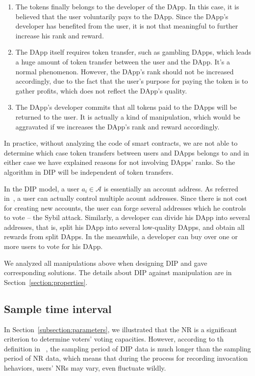   \begin{enumerate}
  	 \item The tokens finally belongs to the developer of the DApp. In this case, it is believed that the user voluntarily pays to the DApp. Since the DApp's developer has benefited from the user, it is not that meaningful to further increase his rank and reward. 
  	\item The DApp itself requires token transfer, such as gambling DApps, which leads  a huge amount of token transfer between the user and the DApp. It's a normal phenomenon. However, the DApp's rank should not be increased accordingly, due to the fact that the user's purpose for paying the token is to gather profits, which does not reflect the DApp's quality.  
   \item The DApp's developer commits that all tokens paid to the DApps will be returned to the user. It is actually a kind of manipulation, which would be aggravated if we increases the DApp's rank and reward accordingly.  
  \end{enumerate}
  In practice, without analyzing the code of smart contracts, we are not able to determine which case token transfers between users and DApps belongs to and in either case we have explained reasons for not involving DApps' ranks. So the algorithm in DIP will be independent of token transfers. 
  
  In the DIP model, a user $a_i \in \mathcal{A}$ is essentially an account address. As referred in~\cite{Nebulasyellowpaper}, a user can actually control multiple acount addresses. Since there is not cost for creating new accounts, the user can forge several addresses which he controls to vote -- the Sybil attack. Similarly, a developer can divide his DApp into several addresses, that is, split his DApp into several low-quality DApps, and obtain all rewards from split DApps. In the meanwhile, a developer can buy over one or more users to vote for his DApp. 
  
  We analyzed all manipulations above when designing DIP and gave corresponding solutions. The details about DIP against manipulation are in Section~\ref{section:properties}.
  
  \subsection{Sample time interval}
  \label{subsection:interval}
  In Section~\ref{subsection:parameters}, we illustrated that the NR is a significant criterion to determine voters' voting capacities. However, according to th definition in ~\cite{Nebulasyellowpaper}, the sampling period of DIP data is much longer than the sampling period of NR data, which means that during the process for recording invocation hehaviors, users' NRs may vary, even fluctuate wildly.
  
